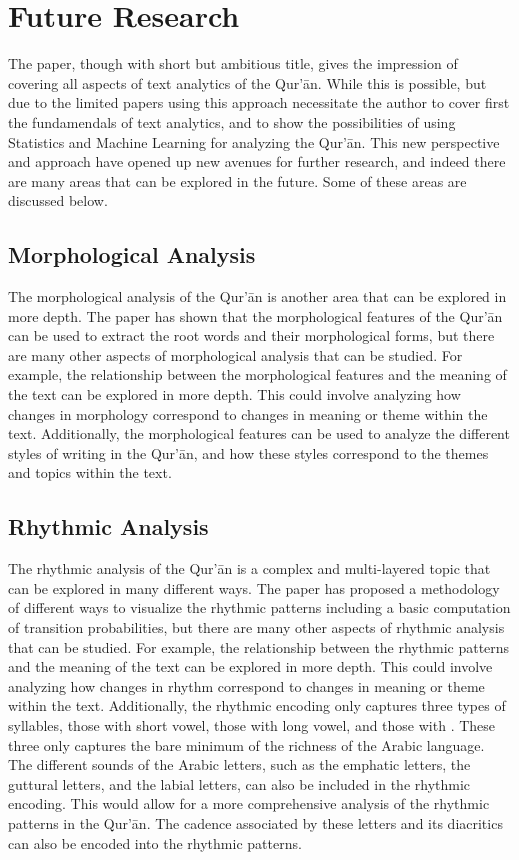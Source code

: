 \chapter{Future Research}\label{ch:future_research}
The paper, though with short but ambitious title, gives the impression of covering all aspects of text analytics of the Qur'\=an. While this is possible, but due to the limited papers using this approach necessitate the author to cover first the fundamendals of text analytics, and to show the possibilities of using Statistics and Machine Learning for analyzing the Qur'\=an. This new perspective and approach have opened up new avenues for further research, and indeed there are many areas that can be explored in the future. Some of these areas are discussed below.

\section{Morphological Analysis}
The morphological analysis of the Qur'\=an is another area that can be explored in more depth. The paper has shown that the morphological features of the Qur'\=an can be used to extract the root words and their morphological forms, but there are many other aspects of morphological analysis that can be studied. For example, the relationship between the morphological features and the meaning of the text can be explored in more depth. This could involve analyzing how changes in morphology correspond to changes in meaning or theme within the text. Additionally, the morphological features can be used to analyze the different styles of writing in the Qur'\=an, and how these styles correspond to the themes and topics within the text.

\section{Rhythmic Analysis}
The rhythmic analysis of the Qur'\=an is a complex and multi-layered topic that can be explored in many different ways. The paper has proposed a methodology of different ways to visualize the rhythmic patterns including a basic computation of transition probabilities, but there are many other aspects of rhythmic analysis that can be studied. For example, the relationship between the rhythmic patterns and the meaning of the text can be explored in more depth. This could involve analyzing how changes in rhythm correspond to changes in meaning or theme within the text. Additionally, the rhythmic encoding only captures three types of syllables, those with short vowel, those with long vowel, and those with  . These three only captures the bare minimum of the richness of the Arabic language. The different sounds of the Arabic letters, such as the emphatic letters, the guttural letters, and the labial letters, can also be included in the rhythmic encoding. This would allow for a more comprehensive analysis of the rhythmic patterns in the Qur'\=an. The cadence associated by these letters and its diacritics can also be encoded into the rhythmic patterns. 

